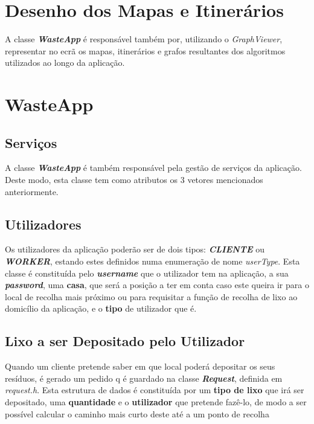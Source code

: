 \documentclass[article, a4paper, 12pt, oneside]{memoir}
\begin{document}
\section{Desenho dos Mapas e Itinerários}

A classe \textbf{\textit{WasteApp}} é responsável também por, utilizando o \textit{GraphViewer}, representar no ecrã os mapas, itinerários e grafos resultantes dos algoritmos utilizados ao longo da aplicação.

\section{WasteApp}

\subsection{Serviços}

A classe \textbf{\textit{WasteApp}} é também responsável pela gestão de serviços da aplicação. Deste modo, esta classe tem como atributos os 3 vetores mencionados anteriormente.

\subsection{Utilizadores}

Os utilizadores da aplicação poderão ser de dois tipos: \textit{\textbf{CLIENTE}} ou \textbf{\textit{WORKER}}, estando estes definidos numa enumeração de nome \textit{userType}. Esta classe é constituída pelo \textit{\textbf{username}} que o utilizador tem na aplicação, a sua \textit{\textbf{password}}, uma \textbf{casa}, que será a posição a ter em conta caso este queira ir para o local de recolha mais próximo ou para requisitar a função de recolha de lixo ao domicílio da aplicação, e o \textbf{tipo} de utilizador que é.

\subsection{Lixo a ser Depositado pelo Utilizador}

Quando um cliente pretende saber em que local poderá depositar os seus resíduos, é gerado um pedido q é guardado na classe \textbf{\textit{Request}}, definida em \textit{request.h}. Esta estrutura de dados é constituída por um \textbf{tipo de lixo} que irá ser depositado, uma \textbf{quantidade} e o \textbf{utilizador} que pretende fazê-lo, de modo a ser possível calcular o caminho mais curto deste até a um ponto de recolha
\end{document}
